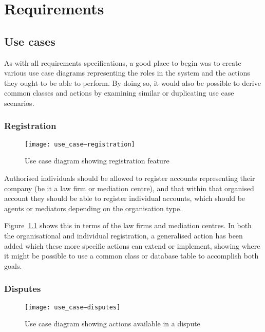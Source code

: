 \chapter{Requirements}

\section{Use cases}

As with all requirements specifications, a good place to begin was to create various use case diagrams representing the roles in the system and the actions they ought to be able to perform. By doing so, it would also be possible to derive common classes and actions by examining similar or duplicating use case scenarios.

\subsection{Registration}

\begin{figure}[h!]
  \centering
    \texttt{[image: use\_case--registration]}
  \caption{Use case diagram showing registration feature}
  \label{uml:useCase:registration}
\end{figure}

Authorised individuals should be allowed to register accounts representing their company (be it a law firm or mediation centre), and that within that organised account they should be able to register individual accounts, which should be agents or mediators depending on the organisation type.

Figure~\ref{uml:useCase:registration} shows this in terms of the law firms and mediation centres. In both the organisational and individual registration, a generalised action has been added which these more specific actions can extend or implement, showing where it might be possible to use a common class or database table to accomplish both goals.

\subsection{Disputes}

\begin{figure}[h!]
  \centering
    \texttt{[image: use\_case--disputes]}
  \caption{Use case diagram showing actions available in a dispute}
  \label{uml:useCase:disputes}
\end{figure}


